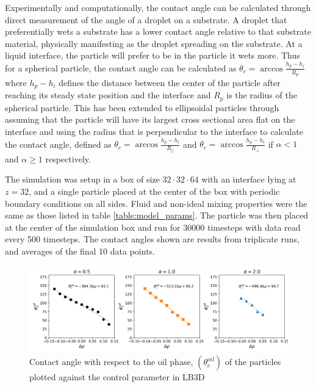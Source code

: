 Experimentally and computationally, the contact angle can be calculated through direct measurement of the angle of a 
droplet on a substrate. A droplet that preferentially wets a substrate has a lower contact angle relative to that 
substrate material, physically manifesting as the droplet spreading on the substrate. At a liquid interface, the particle 
will prefer to be in the particle it wets more. Thus for a spherical particle, the contact angle can be calculated as 
$\theta_c = \arccos{\frac{h_p - h_i}{R_p}}$ where $h_p - h_i$ defines the distance between the center of the particle 
after reaching its steady state position and the interface and $R_p$ is the radius of the spherical particle. 
\cite{gunther_lattice_2013, davies_interface_2014} This has been extended to ellipsoidal particles through assuming 
that the particle will have its largest cross sectional area flat on the interface and using the radius that is 
perpendicular to the interface to calculate the contact angle, defined as $\theta_c = \arccos{\frac{h_p - h_i}{R_{\parallel}}}$ 
and $\theta_c = \arccos{\frac{h_p - h_i}{R_{\perp}}}$ if $\alpha < 1$ and $\alpha \geq 1$ respectively. 

The simulation was setup in a box of size $32\cdot32\cdot64$ with an interface lying at $z = 32$, and a single particle 
placed at the center of the box with periodic boundary conditions on all sides. Fluid and non-ideal mixing properties were 
the same as those listed in table \ref{table:model_params}. The particle was then placed at the center of the simulation 
box and run for $30000$ timesteps with data read every 500 timesteps. The contact angles shown are results from triplicate 
runs, and averages of the final 10 data points. 

\begin{figure}[h]
    \centering
    \includegraphics[scale = 0.5]{figures/model_validation/contact_angle_compare.png}
    \caption{Contact angle with respect to the oil phase, $(\theta_c^{oil})$ of the particles plotted against the 
    control parameter in LB3D}
    \label{fig:contact_angle_valid}
\end{figure}

